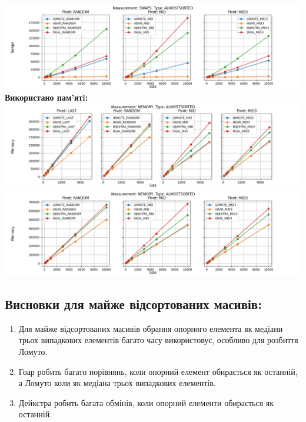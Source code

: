 \documentclass{article}
\begin{document}
        \includegraphics[scale=0.5]{almostsorted_Swaps_3_pivots_7_numbers.png}
        \newline
    \newpage
    \textbf{Використано пам’ятi:}
    \newline
        \includegraphics[scale=0.5]{almostsorted_Memory_6_numbers.png}
        \includegraphics[scale=0.5]{almostsorted_Memory_3_pivots_7_numbers.png}
    \subsection{Висновки для майже відсортованих масивів:}
    \begin{enumerate}
        \item Для майже відсортованих масивів обрання опорного елемента як медіани трьох випадкових елементів багато часу використовує, особливо для розбиття Ломуто.
        \item Гоар робить багато порівнянь, коли опорний елемент обирається як останній, а Ломуто коли як медіана трьох випадкових елементів.
        \item Дейкстра робить багата обмінів, коли опорний елементи обирається як останній.
    \end{enumerate}
    \newpage

\end{document}
